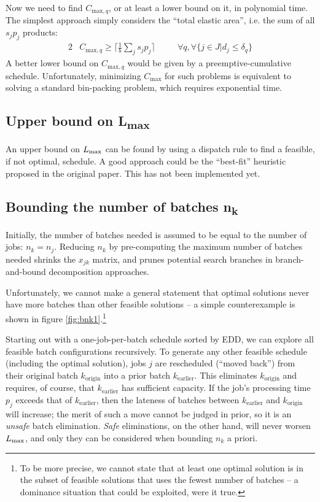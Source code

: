Now we need to find $C_{\text{max},q}$, or at least a lower bound on it, in
polynomial time. The simplest approach simply considers the ``total elastic area'',
i.e. the sum of all $s_j p_j$ products:
\begin{alignat}{2}
& C_{\text{max},q} \geq \big\lceil\frac{1}{b} \sum_{j} s_j
p_j\big\rceil \quad
&& \forall q, \forall \{ j \in J | d_j \leq \delta_q \}
\end{alignat}
A better lower bound on $C_{\text{max},q}$ would be given by a
preemptive-cumulative schedule. Unfortunately, minimizing $C_{\text{max}}$ for
such problems is equivalent to solving a standard bin-packing problem, which
requires exponential time. 

\subsection[Upper bound on $\Lmax$]{Upper bound on {\sansitalicfont L}\textsubscript{max}}
An upper bound on $\Lmax$ can be found by using a dispatch rule to find a
feasible, if not optimal, schedule. A good approach could be the ``best-fit''
heuristic proposed in the original paper. {\color{darkred} This has not been
implemented yet.}

\subsection[Bounding the number of batches $n_k$]{Bounding the number of batches \sansitalicfont n\textsubscript{k}}
Initially, the number of batches needed is assumed to be equal to the number of
jobs: $n_k = n_j$. Reducing $n_k$ by pre-computing the maximum number of batches
needed shrinks the $x_{jk}$ matrix, and prunes potential search branches in
branch-and-bound decomposition approaches.



Unfortunately, we cannot make a general statement that optimal solutions never have more batches than other feasible solutions -- a simple counterexample is shown in figure \ref{fig:bnk1}.\footnote{To be more precise, we cannot state that at least one optimal solution is in the subset of feasible solutions that uses the fewest number of batches -- a dominance situation that could be exploited, were it true.}

Starting out with a one-job-per-batch schedule sorted by EDD, we can explore
all feasible batch configurations recursively. To generate any other feasible
schedule (including the optimal solution), jobs $j$ are rescheduled (``moved back'')
from their original batch $k_\text{origin}$ into a prior batch
$k_\text{earlier}$. This eliminates $k_\text{origin}$ and requires, of course,
that $k_\text{earlier}$ has sufficient capacity. If the job's processing time
$p_j$ exceeds that of $k_\text{earlier}$, then the lateness of batches between
$k_\text{earlier}$ and $k_\text{origin}$ will increase; the merit of such a move
cannot be judged in prior, so it is an \textit{unsafe} batch elimination.
\textit{Safe} eliminations, on the other hand, will never worsen $\Lmax$, and
only they can be considered when bounding $n_k$ a priori.

